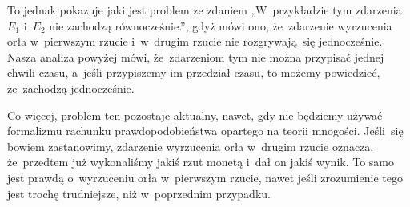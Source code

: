 \documentclass[a4paper,11pt]{article}
\numberwithin{equation}{section}
\begin{document}
To jednak pokazuje jaki jest problem ze zdaniem „W~przykładzie tym zdarzenia
$E_{ 1 }$ i~$E_{ 2 }$ nie zachodzą równocześnie.”, gdyż mówi ono, że~zdarzenie
wyrzucenia orła w~pierwszym rzucie i~w~drugim rzucie nie rozgrywają~się
jednocześnie. Nasza analiza powyżej mówi, że~zdarzeniom tym nie można
przypisać jednej chwili czasu, a~jeśli przypiszemy im przedział czasu, to
możemy powiedzieć, że~zachodzą jednocześnie.

Co więcej, problem ten pozostaje aktualny, nawet, gdy nie będziemy używać
formalizmu rachunku prawdopodobieństwa opartego na teorii mnogości.
Jeśli~się bowiem zastanowimy, zdarzenie wyrzucenia orła w~drugim rzucie
oznacza, że~przedtem już wykonaliśmy jakiś rzut monetą i~dał on jakiś wynik.
To samo jest prawdą o~wyrzuceniu orła w~pierwszym rzucie, nawet jeśli
zrozumienie tego jest trochę trudniejsze, niż w~poprzednim przypadku.

\VerSpaceFour





\noindent
{}























\printbibliography





\end{document}

